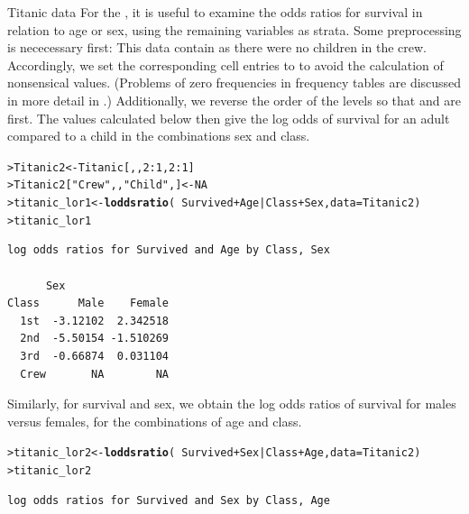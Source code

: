 \documentclass[10pt,krantz2]{krantz}\usepackage[]{graphicx}\usepackage[]{color}
\makeatletter
\newcommand{\hlnum}[1]{\textcolor[rgb]{0.686,0.059,0.569}{#1}}%
\newcommand{\hlstr}[1]{\textcolor[rgb]{0.192,0.494,0.8}{#1}}%
\newcommand{\hlopt}[1]{\textcolor[rgb]{0,0,0}{#1}}%
\newcommand{\hlstd}[1]{\textcolor[rgb]{0.345,0.345,0.345}{#1}}%
\newcommand{\hlkwb}[1]{\textcolor[rgb]{0.69,0.353,0.396}{#1}}%
\newcommand{\hlkwc}[1]{\textcolor[rgb]{0.333,0.667,0.333}{#1}}%
\newcommand{\hlkwd}[1]{\textcolor[rgb]{0.737,0.353,0.396}{\textbf{#1}}}%
\newenvironment{kframe}{%
 \def\at@end@of@kframe{}%
 \ifinner\ifhmode%
  \def\at@end@of@kframe{\end{minipage}}%
  \begin{minipage}{\columnwidth}%
 \fi\fi%
 \def\FrameCommand##1{\hskip\@totalleftmargin \hskip-\fboxsep
 \colorbox{shadecolor}{##1}\hskip-\fboxsep
     \hskip-\linewidth \hskip-\@totalleftmargin \hskip\columnwidth}%
 \MakeFramed {\advance\hsize-\width
   \@totalleftmargin\z@ \linewidth\hsize
   \@setminipage}}%
 {\par\unskip\endMakeFramed%
 \at@end@of@kframe}
\newenvironment{knitrout}{}{} %
\renewenvironment{knitrout}{\small\renewcommand{\baselinestretch}{.85}}{} %
\makeatother
\begin{document}
\begin{Example}{Titanic data}
For the , it is useful to examine the odds ratios for
survival in relation to age or sex, using the remaining variables as strata. 
Some preprocessing is nececessary first: This data contain
 as there were no children in the
crew. Accordingly, we set the corresponding cell entries to 
to avoid the calculation of nonsensical values. (Problems of zero
frequencies in frequency tables are discussed in more detail in .)
Additionally, we reverse the order of the levels so that  and
 are first.  The values calculated below then give the log odds of survival for an
adult compared to a child in the combinations sex and class.
\begin{knitrout}
\color{fgcolor}\begin{kframe}
\begin{alltt}
\hlstd{> }\hlstd{Titanic2} \hlkwb{<-} \hlstd{Titanic[,,}\hlnum{2}\hlopt{:}\hlnum{1}\hlstd{,}\hlnum{2}\hlopt{:}\hlnum{1}\hlstd{]}
\hlstd{> }\hlstd{Titanic2[}\hlstr{"Crew"}\hlstd{,,}\hlstr{"Child"}\hlstd{,]} \hlkwb{<-} \hlnum{NA}
\hlstd{> }\hlstd{titanic_lor1} \hlkwb{<-} \hlkwd{loddsratio}\hlstd{(}\hlopt{~} \hlstd{Survived} \hlopt{+} \hlstd{Age} \hlopt{|} \hlstd{Class} \hlopt{+} \hlstd{Sex,} \hlkwc{data} \hlstd{= Titanic2)}
\hlstd{> }\hlstd{titanic_lor1}
\end{alltt}
\begin{verbatim}
log odds ratios for Survived and Age by Class, Sex 

      Sex
Class      Male    Female
  1st  -3.12102  2.342518
  2nd  -5.50154 -1.510269
  3rd  -0.66874  0.031104
  Crew       NA        NA
\end{verbatim}
\end{kframe}
\end{knitrout}
Similarly, for survival and sex, we obtain the log odds ratios of
survival for males versus females, for the combinations of age and class.%
\begin{knitrout}
\color{fgcolor}\begin{kframe}
\begin{alltt}
\hlstd{> }\hlstd{titanic_lor2} \hlkwb{<-} \hlkwd{loddsratio}\hlstd{(}\hlopt{~} \hlstd{Survived} \hlopt{+} \hlstd{Sex} \hlopt{|} \hlstd{Class} \hlopt{+} \hlstd{Age,} \hlkwc{data} \hlstd{= Titanic2)}
\hlstd{> }\hlstd{titanic_lor2}
\end{alltt}
\begin{verbatim}
log odds ratios for Survived and Sex by Class, Age 


\end{verbatim}
\end{kframe}
\end{knitrout}
\end{Example}
\end{document}
